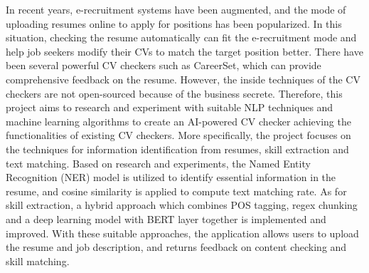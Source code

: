 \abstracttitle
%
{\singlespacing

In recent years, e-recruitment systems have been augmented, and the mode of uploading resumes online to apply for positions has been popularized. In this situation, checking the resume automatically can fit the e-recruitment mode and help job seekers modify their CVs to match the target position better. There have been several powerful CV checkers such as CareerSet, which can provide comprehensive feedback on the resume. However, the inside techniques of the CV checkers are not open-sourced because of the business secrete. Therefore, this project aims to research and experiment with suitable NLP techniques and machine learning algorithms to create an AI-powered CV checker achieving the functionalities of existing CV checkers. More specifically, the project focuses on the techniques for information identification from resumes, skill extraction and text matching. Based on research and experiments, the Named Entity Recognition (NER) model is utilized to identify essential information in the resume, and cosine similarity is applied to compute text matching rate. As for skill extraction, a hybrid approach which combines POS tagging, regex chunking and a deep learning model with BERT layer together is implemented and improved. With these suitable approaches, the application allows users to upload the resume and job description, and returns feedback on content checking and skill matching.
}

